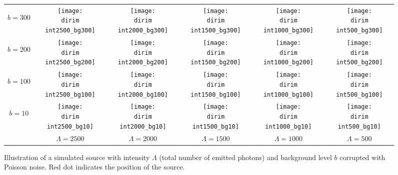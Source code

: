 \begin{figure}[!bt]
	\centering
	\newcommand{\wf}{.15\textwidth}
	\newcommand{\dirim}{\qd gFREM/images/psf2/}
	\newcommand{\vs}{.4}
	\begin{tabular}{c|ccccc}
		\begin{sideways}\hspace{\vs cm}$b=300$\end{sideways}
		&\texttt{[image: \\dirim int2500\_bg300]}
		&\texttt{[image: \\dirim int2000\_bg300]}
		&\texttt{[image: \\dirim int1500\_bg300]}
		&\texttt{[image: \\dirim int1000\_bg300]}
		&\texttt{[image: \\dirim int500\_bg300]}\\
		\begin{sideways}\hspace{\vs cm}$b=200$\end{sideways}
		&\texttt{[image: \\dirim int2500\_bg200]}
		&\texttt{[image: \\dirim int2000\_bg200]}
		&\texttt{[image: \\dirim int1500\_bg200]}
		&\texttt{[image: \\dirim int1000\_bg200]}
		&\texttt{[image: \\dirim int500\_bg200]}\\
		\begin{sideways}\hspace{\vs cm}$b=100$\end{sideways}
		&\texttt{[image: \\dirim int2500\_bg100]}
		&\texttt{[image: \\dirim int2000\_bg100]}
		&\texttt{[image: \\dirim int1500\_bg100]}
		&\texttt{[image: \\dirim int1000\_bg100]}
		&\texttt{[image: \\dirim int500\_bg100]}\\
		\begin{sideways}\hspace{\vs cm}$b=10$\end{sideways}
		&\texttt{[image: \\dirim int2500\_bg10]}
		&\texttt{[image: \\dirim int2000\_bg10]}
		&\texttt{[image: \\dirim int1500\_bg10]}
		&\texttt{[image: \\dirim int1000\_bg10]}
		&\texttt{[image: \\dirim int500\_bg10]}\\
		\hline
		&$\Lambda=2500$ & $\Lambda=2000$ & $\Lambda=1500$ & $\Lambda=1000$ & $\Lambda=500$\\
	\end{tabular}
	\caption{Illustration of a simulated source with intensity $\Lambda$ (total number of emitted photons) and background level $b$ corrupted with Poisson noise. Red dot indicates the position of the source.}
	\label{fig:PSF int bg}
\end{figure}

